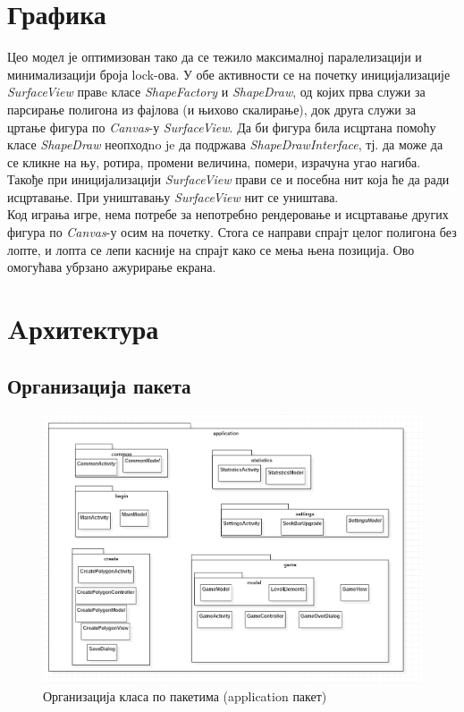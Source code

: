 \section{Графика}


 Цео модел је оптимизован тако да се тежило максималној паралелизацији и минимализацији броја lock-ова. У обе активности се на почетку иницијализације \emph{SurfaceView} правe класе \emph{ShapeFactory} и \emph{ShapeDraw}, од којих прва служи за парсирање полигона из фајлова (и њихово скалирање), док друга служи за цртање фигура по \emph{Canvas}-у \emph{SurfaceView}. Да би фигура била исцртана помоћу класе \emph{ShapeDraw} неопходno je да подржава \emph{ShapeDrawInterface}, тј. да може да се кликне на њу, ротира, промени величина, помери, израчуна угао нагиба. Такође при иницијализацији \emph{SurfaceView} прави се и посебна нит која ће да ради исцртавање. При уништавању \emph{SurfaceView} нит се уништава.
\\ \indent
Код играња игре, нема потребе за непотребно рендеровање и исцртавање других фигура по \emph{Canvas}-у осим на почетку. Стога се направи спрајт целог полигона без лопте, и лопта се лепи касније на спрајт како се мења њена позиција. Ово омогућава убрзано ажурирање екрана.

\section{Aрхитектура} \label{Architecture}

\subsection{Организација пакета}

\begin{figure}[htb!]
\begin{center}
\includegraphics[scale=.7]{pictures/UML/package/application}
\caption{Организација класа по пакетима (application пакет)}\label{fig:umlPackageApp}
\end{center}
\end{figure}

